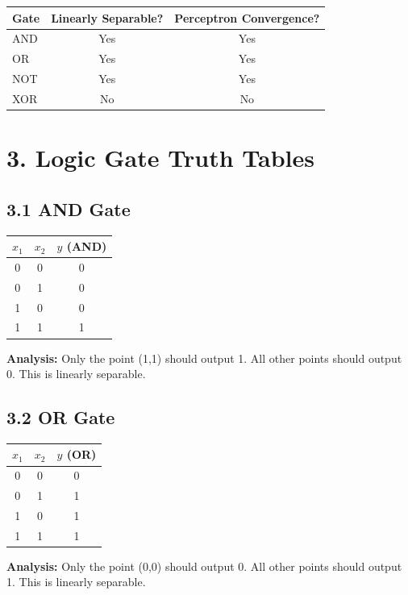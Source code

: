 \documentclass[11pt]{article}
\begin{document}
\begin{center}
\begin{tabular}{|l|c|c|}
\hline
\textbf{Gate} & \textbf{Linearly Separable?} & \textbf{Perceptron Convergence?}\\
\hline
AND & Yes & Yes\\
\hline
OR & Yes & Yes\\
\hline
NOT & Yes & Yes\\
\hline
XOR & No & No\\
\hline
\end{tabular}
\end{center}

\section*{3. Logic Gate Truth Tables}

\subsection*{3.1 AND Gate}
\begin{center}
\begin{tabular}{|c|c|c|}
\hline
$x_1$ & $x_2$ & $y$ (AND)\\ \hline
0 & 0 & 0\\ \hline
0 & 1 & 0\\ \hline
1 & 0 & 0\\ \hline
1 & 1 & 1\\ \hline
\end{tabular}
\end{center}
\textbf{Analysis:} Only the point (1,1) should output 1. All other points should output 0. This is linearly separable.

\subsection*{3.2 OR Gate}
\begin{center}
\begin{tabular}{|c|c|c|}
\hline
$x_1$ & $x_2$ & $y$ (OR)\\ \hline
0 & 0 & 0\\ \hline
0 & 1 & 1\\ \hline
1 & 0 & 1\\ \hline
1 & 1 & 1\\ \hline
\end{tabular}
\end{center}
\textbf{Analysis:} Only the point (0,0) should output 0. All other points should output 1. This is linearly separable.
\end{document}

